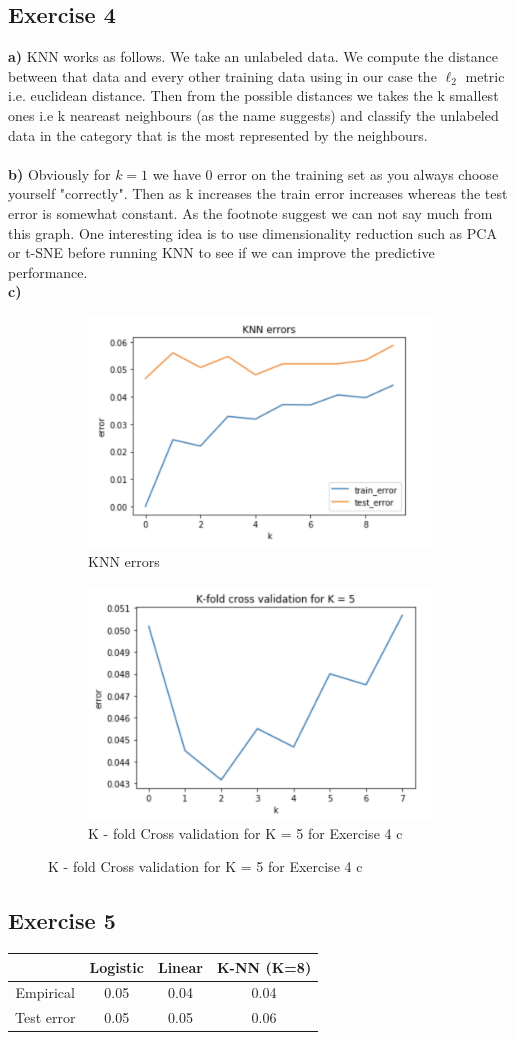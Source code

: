 \documentclass[10pt,a4paper]{article}
\begin{document}
\subsection*{Exercise 4}
\textbf{a)} KNN works as follows. We take an unlabeled data.  We compute the distance between that data and every other training data using in our case the $\ell_2$ metric i.e. euclidean distance. Then from the possible distances we takes the k smallest ones i.e k neareast neighbours (as the name suggests) and classify the unlabeled data in the category that is the most represented by the neighbours.\\\\ 
\textbf{b)} 
Obviously for $k = 1$ we have 0 error on the training set as you always choose yourself "correctly". Then as k increases the train error increases whereas the test error is somewhat constant. As the footnote suggest we can not say much from this graph. One interesting idea is to use dimensionality reduction such as PCA or t-SNE before running KNN to see if we can improve the predictive performance.\\
\textbf{c)}
\begin{figure}[h!]
\begin{subfigure}[b]{0.5\textwidth}
\includegraphics[width =  0.7 \textwidth]{figures/knn}
\centering
\caption{KNN errors}
\end{subfigure}
\begin{subfigure}[b] {0.5 \textwidth}
\centering
\includegraphics[width = 0.7 \textwidth]{figures/cross}
\caption{K - fold Cross validation  for K = 5 for Exercise 4 c  }
\end{subfigure}
\end{figure}

\subsection*{Exercise 5}
\begin{center}
\begin{tabular}{| c | c | c| c| }
\hline
 & Logistic & Linear & K-NN  (K=8)\\
 \hline
Empirical & 0.05 & 0.04 & 0.04\\
\hline
Test error & 0.05 & 0.05 & 0.06\\
\hline
\end{tabular}
\end{center}
\end{document}
